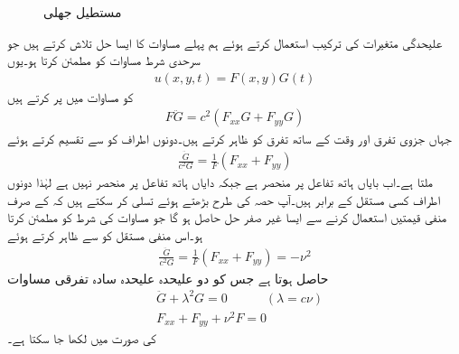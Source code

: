 \begin{figure}
\centering
{}
\caption{مستطیل جھلی}
\label{شکل_جزوی_مستطیل_جھلی}
\end{figure}
 \quad علیحدگی متغیرات کی ترکیب استعمال کرتے ہوئے ہم پہلے مساوات  کا ایسا حل تلاش کرتے ہیں جو سرحدی شرط مساوات  کو مطمئن کرتا ہو۔یوں
\begin{align}\label{مساوات_جزوی_مستطیل_جھلی_ٹ}
u(x,y,t)=F(x,y)G(t)
\end{align}
کو مساوات  میں پر کرتے ہیں
\begin{align*}
F\ddot{G}=c^2(F_{xx}G+F_{yy}G)
\end{align*}
جہاں  جزوی تفرق اور  وقت  کے ساتھ تفرق کو ظاہر کرتے ہیں۔دونوں اطراف کو  سے تقسیم کرتے ہوئے
\begin{align*}
\frac{\ddot{G}}{c^2G}=\frac{1}{F}(F_{xx}+F_{yy})
\end{align*}
ملتا ہے۔اب بایاں ہاتھ تفاعل  پر منحصر ہے جبکہ دایاں ہاتھ  تفاعل  پر منحصر نہیں ہے لہٰذا دونوں اطراف کسی مستقل  کے برابر ہیں۔آپ   حصہ  کی طرح  بڑھتے ہوئے تسلی کر سکتے ہیں کہ   کے صرف منفی قیمتیں استعمال کرنے سے ایسا غیر صفر حل حاصل ہو گا جو مساوات  کی شرط کو مطمئن کرتا ہو۔اس منفی مستقل کو  سے ظاہر کرتے ہوئے 
\begin{align*}
\frac{\ddot{G}}{c^2G}=\frac{1}{F}(F_{xx}+F_{yy})=-\nu^2
\end{align*}
حاصل ہوتا ہے جس کو دو علیحدہ علیحدہ سادہ تفرقی مساوات
\begin{align}
&\ddot{G}+\lambda^2G=0\quad \quad\quad (\lambda=c\nu)\label{مساوات_جزوی_مستطیل_جھلی_ث}\\
&F_{xx}+F_{yy}+\nu^2F=0\label{مساوات_جزوی_مستطیل_جھلی_ج}
\end{align}
کی صورت میں لکھا جا سکتا ہے۔


